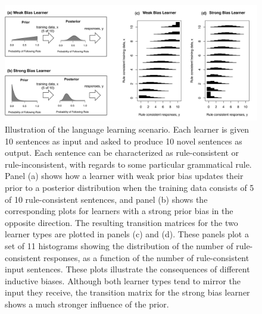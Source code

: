 \documentclass[doc]{apa6}
\begin{document}
\begin{figure}[t]
\begin{center}
\includegraphics[width=15cm]{bbTrans.pdf}
\caption{{\small Illustration of the language learning scenario. Each learner is given 10 sentences as input and asked to produce 10 novel sentences as output. Each sentence can be characterized as rule-consistent or rule-inconsistent, with regards to some particular grammatical rule. Panel (a) shows how a learner with {\sc weak} prior bias updates their prior to a posterior distribution when the training data consists of 5 of 10 rule-consistent sentences, and panel (b) shows the corresponding plots for learners with a {\sc strong} prior bias in the opposite direction. The resulting transition matrices for the two learner types are plotted in panels (c) and (d). These panels plot a set of 11 histograms showing the distribution of the number of rule-consistent responses, as a function of the number of rule-consistent input sentences. These plots illustrate the consequences of different inductive biases. Although both learner types tend to mirror the input they receive, the transition matrix for the {\sc strong} bias learner shows a much stronger influence of the prior.}}
\label{indbias}
\end{center}
\end{figure}
\end{document}

